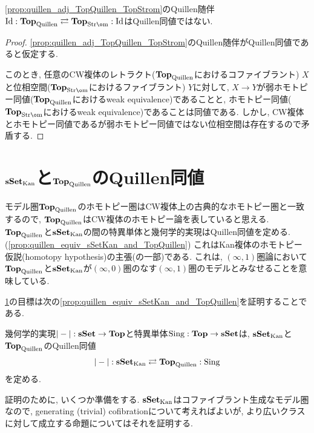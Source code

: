 \documentclass[uplatex, a4paper, 14Q, dvipdfmx]{jsarticle}
\begin{document}
\begin{remark}
  \cref{prop:quillen_adj_TopQuillen_TopStrom}のQuillen随伴$\Id : \TopQuillen \rightleftarrows \TopStrom : \Id$はQuillen同値ではない. 
\end{remark}

\begin{proof}
  \cref{prop:quillen_adj_TopQuillen_TopStrom}のQuillen随伴がQuillen同値であると仮定する.

  このとき, 任意のCW複体のレトラクト($\mathbf{Top}_\mathrm{Quillen}$におけるコファイブラント) $X$と位相空間($\TopStrom$におけるファイブラント) $Y$に対して, $X \to Y$が弱ホモトピー同値($\mathbf{Top}_\mathrm{Quillen}$におけるweak equivalence)であることと, ホモトピー同値($\TopStrom$におけるweak equivalence)であることは同値である. 
  しかし, CW複体とホモトピー同値であるが弱ホモトピー同値ではない位相空間は存在するので矛盾する.
\end{proof}

\section{$\mathbf{sSet}_\mathrm{Kan}$と$\mathbf{Top}_\mathrm{Quillen}$のQuillen同値} \label{sec:quillen_equiv_sSetKan_and_TopQuillen}

モデル圏$\mathbf{Top}_\mathrm{Quillen}$のホモトピー圏はCW複体上の古典的なホモトピー圏と一致するので, $\mathbf{Top}_\mathrm{Quillen}$はCW複体のホモトピー論を表していると思える. 
$\mathbf{Top}_\mathrm{Quillen}$と$\mathbf{sSet}_\mathrm{Kan}$の間の特異単体と幾何学的実現はQuillen同値を定める. (\cref{prop:quillen_equiv_sSetKan_and_TopQuillen})
これはKan複体のホモトピー仮説(homotopy hypothesis)の主張(の一部)である. 
これは, $(\infty,1)$圏論において$\mathbf{Top}_\mathrm{Quillen}$と$\mathbf{sSet}_\mathrm{Kan}$が$(\infty,0)$圏のなす$(\infty,1)$圏のモデルとみなせることを意味している. 

\cref{sec:quillen_equiv_sSetKan_and_TopQuillen}の目標は次の\cref{prop:quillen_equiv_sSetKan_and_TopQuillen}を証明することである. 

\begin{proposition} \label{prop:quillen_equiv_sSetKan_and_TopQuillen}
  幾何学的実現$|-| : \mathbf{sSet} \to \mathbf{Top}$と特異単体$\mathrm{Sing} : \mathbf{Top} \to \mathbf{sSet}$は, $\mathbf{sSet}_\mathrm{Kan}$と$\mathbf{Top}_\mathrm{Quillen}$のQuillen同値 
  \begin{align*}
    |-| : \mathbf{sSet}_\mathrm{Kan} \rightleftarrows \mathbf{Top}_\mathrm{Quillen} : \mathrm{Sing}
  \end{align*}
  を定める. 
\end{proposition}

証明のために, いくつか準備をする. 
$\mathbf{sSet}_\mathrm{Kan}$はコファイブラント生成なモデル圏なので, generating (trivial) cofibrationについて考えればよいが, より広いクラスに対して成立する命題についてはそれを証明する.  
\end{document}
